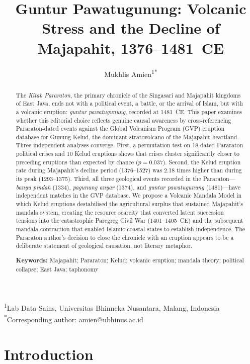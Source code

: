 \documentclass[12pt,a4paper]{article}
\title{\textbf{Guntur Pawatugunung: Volcanic Stress and the Decline of Majapahit, 1376--1481~CE}}
\author{Mukhlis Amien\textsuperscript{1*}}
\date{}
\begin{document}
\maketitle

\noindent\textsuperscript{1}Lab Data Sains, Universitas Bhinneka Nusantara, Malang, Indonesia\\
\noindent\textsuperscript{*}Corresponding author: amien@ubhinus.ac.id

\begin{abstract}
The \textit{Kitab Pararaton}, the primary chronicle of the Singasari and Majapahit kingdoms of East Java, ends not with a political event, a battle, or the arrival of Islam, but with a volcanic eruption: \textit{guntur pawatugunung}, recorded at 1481~CE.
This paper examines whether this editorial choice reflects genuine causal awareness by cross-referencing Pararaton-dated events against the Global Volcanism Program (GVP) eruption database for Gunung Kelud, the dominant stratovolcano of the Majapahit heartland.
Three independent analyses converge.
First, a permutation test on 18 dated Pararaton political crises and 10 Kelud eruptions shows that crises cluster significantly closer to preceding eruptions than expected by chance ($p = 0.037$).
Second, the Kelud eruption rate during Majapahit's decline period (1376--1527) was 2.18 times higher than during its peak (1293--1375).
Third, all three geological events recorded in the Pararaton---\textit{banyu pindah} (1334), \textit{pagunung anyar} (1374), and \textit{guntur pawatugunung} (1481)---have independent matches in the GVP database.
We propose a Volcanic Mandala Model in which Kelud eruptions destabilised the agricultural surplus that sustained Majapahit's mandala system, creating the resource scarcity that converted latent succession tensions into the catastrophic Paregreg Civil War (1401--1405~CE) and the subsequent mandala contraction that enabled Islamic coastal states to establish independence.
The Pararaton author's decision to close the chronicle with an eruption appears to be a deliberate statement of geological causation, not literary metaphor.

\medskip\noindent\textbf{Keywords:} Majapahit; Pararaton; Kelud; volcanic eruption; mandala theory; political collapse; East Java; taphonomy
\end{abstract}

\section{Introduction}
\end{document}
